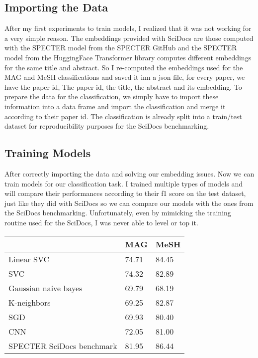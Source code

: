 \documentclass[conference]{IEEEtran}
\begin{document}
\subsection{Importing the Data}

After my first experiments to train models, I realized that it was not working for a very simple reason. The embeddings provided with SciDocs are those computed with the SPECTER model from the SPECTER GitHub and the SPECTER model from the HuggingFace Transformer library computes different embeddings for the same title and abstract. So I re-computed the embeddings used for the MAG and MeSH classifications and saved it inn a json file, for every paper, we have the paper id, The paper id, the title, the abstract and its embedding. To prepare the data for the classification, we simply have to import these information into a data frame and import the classification and merge it according to their paper id. The classification is already split into a train/test dataset for reproducibility purposes for the SciDocs benchmarking.

\subsection{Training Models}

After correctly importing the data and solving our embedding issues. Now we can train models for our classification task. I trained multiple types of models and will compare their performances according to their f1 score on the test dataset, just like they did with SciDocs so we can compare our models with the ones from the SciDocs benchmarking. Unfortunately, even by mimicking the training routine used for the SciDocs, I was never able to level or top it.

\begin{table}[!h]
\centering
\begin{tabular}{|l|l|l|}
\hline
                          & MAG   & MeSH  \\ \hline
Linear SVC                & 74.71 & 84.45 \\ \hline
SVC                       & 74.32 & 82.89 \\ \hline
Gaussian naive bayes      & 69.79 & 68.19 \\ \hline
K-neighbors               & 69.25 & 82.87 \\ \hline
SGD                       & 69.93 & 80.40 \\ \hline
CNN                       & 72.05 & 81.00 \\ \hline
SPECTER SciDocs benchmark & 81.95 & 86.44 \\ \hline
\end{tabular}
\end{table}
\end{document}
